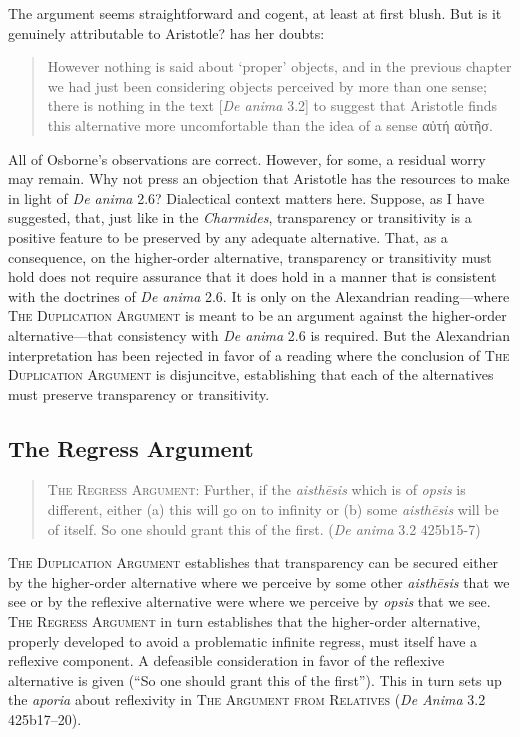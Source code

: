 The argument seems straightforward and cogent, at least at first blush. But is it genuinely attributable to Aristotle? \citet[402]{Osborne:1983le} has her doubts:
\begin{quote}
	However nothing is said about `proper' objects, and in the previous chapter we had just been considering objects perceived by more than one sense; there is nothing in the text [\emph{De anima} 3.2] to suggest that Aristotle finds this alternative more uncomfortable than the idea of a sense {\sbl αὐτή αὺτῆσ}. \citep[402]{Osborne:1983le}
\end{quote}
All of Osborne's observations are correct. However, for some, a residual worry may remain. Why not press an objection that Aristotle has the resources to make in light of \emph{De anima} 2.6? Dialectical context matters here. Suppose, as I have suggested, that, just like in the \emph{Charmides}, transparency or transitivity is a positive feature to be preserved by any adequate alternative. That, as a consequence, on the higher-order alternative, transparency or transitivity must hold does not require assurance that it does hold in a manner that is consistent with the doctrines of \emph{De anima} 2.6. It is only on the Alexandrian reading—where \textsc{The Duplication Argument} is meant to be an argument against the higher-order alternative—that consistency with \emph{De anima} 2.6 is required. But the Alexandrian interpretation has been rejected in favor of a reading where the conclusion of \textsc{The Duplication Argument} is disjuncitve, establishing that each of the alternatives must preserve transparency or transitivity.


\subsection{The Regress Argument} %
\label{sub:the_regress_argument}

\begin{quote}
	\textsc{The Regress Argument}: Further, if the \emph{aisthēsis} which is of \emph{opsis} is different, either (a) this will go on to infinity or (b) some \emph{aisthēsis} will be of itself. So one should grant this of the first. (\emph{De anima} 3.2 425b15-7)
\end{quote}

\textsc{The Duplication Argument} establishes that transparency can be secured either by the higher-order alternative where we perceive by some other \emph{aisthēsis} that we see or by the reflexive alternative were where we perceive by \emph{opsis} that we see. \textsc{The Regress Argument} in turn establishes that the higher-order alternative, properly developed to avoid a problematic infinite regress, must itself have a reflexive component. A defeasible consideration in favor of the reflexive alternative is given (``So one should grant this of the first''). This in turn sets up the \emph{aporia} about reflexivity in \textsc{The Argument from Relatives} (\emph{De Anima} 3.2 425b17–20).

